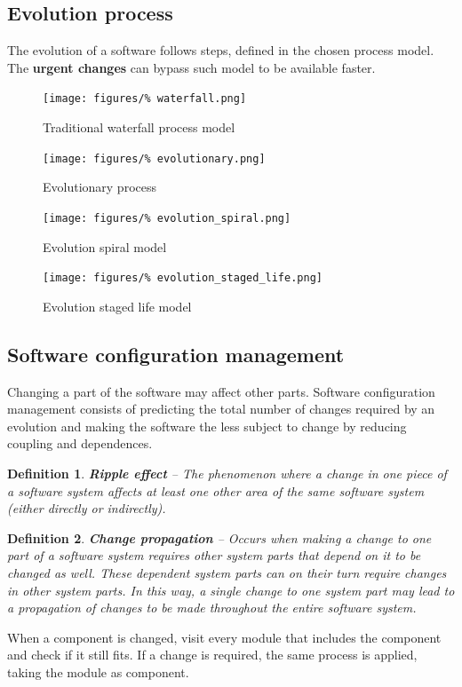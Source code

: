 \documentclass[a4paper,11pt]{report}
\newtheorem{definition}{Definition}
\begin{document}
	\subsection{Evolution process}
		The evolution of a software follows steps,
			defined in the chosen process model.
			The \textbf{urgent changes} can bypass 
			such model to be available faster.
		\begin{figure}[H]
			\centering
			\texttt{[image: figures/\%
				waterfall.png]}
			\caption{Traditional waterfall process model}
		\end{figure}\noindent
		\begin{figure}[H]
			\centering
			\texttt{[image: figures/\%
				evolutionary.png]}
			\caption{Evolutionary process}
		\end{figure}\noindent
		\begin{minipage}{0.5\textwidth}
			\begin{figure}[H]
				\hspace*{-1cm}
				\texttt{[image: figures/\%
					evolution\_spiral.png]}
				\caption{Evolution spiral model}
			\end{figure}\noindent
		\end{minipage}\hfill
		\begin{minipage}{0.475\textwidth}
			\vspace*{1cm}
			\begin{figure}[H]
				\centering
				\texttt{[image: figures/\%
					evolution\_staged\_life.png]}
				\caption{Evolution staged life model}
			\end{figure}\noindent
		\end{minipage}
	\subsection{Software configuration management}
		\noindent
		Changing a part of the software may
			affect other parts. Software
			configuration management consists 
			of predicting the total number
			of changes required by an evolution and
			making the software the less 
			subject to change by reducing
			coupling and dependences.
		\begin{definition}
			\textbf{Ripple effect} -- 
				The phenomenon where a change 
				in one piece of a software system
				affects at least one other area of 
				the same software system (either
				directly or indirectly).
		\end{definition}
		\begin{definition}
			\textbf{Change propagation} --
				Occurs when making a change to one 
				part of a software system
				requires other system parts that 
				depend on it to be changed as well.
				These dependent system parts can on 
				their turn require changes in
				other system parts. In this way, a 
				single change to one system part
				may lead to a propagation of changes 
				to be made throughout the
				entire software system.
		\end{definition}
		When a component is changed, visit every
			module that includes the component
			and check if it still fits.
			If a change is required, the same process
			is applied, taking the module as
			component.
%
\newpage
%
\end{document}
